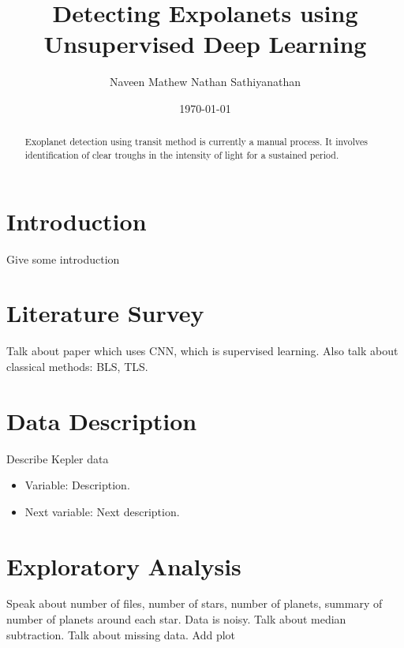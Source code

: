 \documentclass[%
aip,
amsmath,amssymb,
reprint,%
]{revtex4-1}
\begin{document}
\title{Detecting Expolanets using Unsupervised Deep Learning}

\author{Naveen Mathew Nathan Sathiyanathan}

\date{\today}

\begin{abstract}
Exoplanet detection using transit method is currently a manual process. It involves identification of clear troughs in the intensity of light for a sustained period. 
\end{abstract}

\maketitle

\section{Introduction}

Give some introduction

\section{Literature Survey}

Talk about paper which uses CNN, which is supervised learning. Also talk about classical methods: BLS, TLS.

\section{Data Description}

Describe Kepler data

\begin{itemize}
	\item Variable: Description.
	\item Next variable: Next description.
\end{itemize}

\section{Exploratory Analysis}

Speak about number of files, number of stars, number of planets, summary of number of planets around each star. Data is noisy. Talk about median subtraction. Talk about missing data. Add plot
\end{document}
